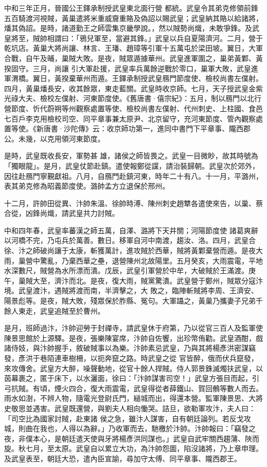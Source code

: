 \begin{pinyinscope}
 中和三年正月，晉國公王鐸承制授武皇東北面行營
 都統。武皇令其弟克修領前鋒五百騎渡河視賊，黃巢遣將米重威齎重賂及偽詔以賜武皇；武皇納其賂以給諸將，燔其偽詔。是時，諸道勤王之師雲集京畿學說。，然以賊勢尚熾，未敢爭鋒。及武皇將至，賊帥相謂曰：「鴉兒軍至，當避其鋒。」武皇以兵自夏陽濟河。二月，營于乾坑店。黃巢大將尚讓、林言、王璠、趙璋等引軍十五萬屯於梁田坡。翼日，大軍合戰，自午及晡，巢賊大敗。是夜，賊眾遁據華州。武皇進軍圍之，巢弟黃鄴、黃揆固守。三月，尚讓
 引大軍赴援，武皇率兵萬餘逆戰於零口，巢軍大敗，武皇進軍渭橋。翼日，黃揆棄華州而遁。王鐸承制授武皇鴈門節度使、檢校尚書左僕射。四月，黃巢燔長安，收其餘眾，東走藍關。武皇時收京師。七月，天子授武皇金紫光祿大夫、檢校左僕射、河東節度使。《舊唐書·僖宗紀》：五月，制以鴈門以北行營節度、忻代蔚朔等州觀察處置等使、檢校尚書左僕射、代州刺史、上柱國、食邑七百戶李克用檢校司空、同平章事兼太原尹、北京留守，充河東節度、管內觀察處置等使。《新唐書·沙陀傳》云：收京師功第一，進同中書門下平章事、隴西郡公。未幾，以克用領河東節度。



 是時，武皇既收長安，軍勢甚
 雄，諸侯之師皆畏之。武皇一目微眇，故其時號為「獨眼龍」。是月，武皇仗節赴鎮。遣使報鄭從讜，請治裝歸朝。武皇次於郊外，因往赴鴈門寧覲獻祖。八月，自鴈門赴鎮河東，時年二十有八。十一月，平潞州，表其弟克修為昭義節度使。潞帥孟方立退保於邢州。



 十二月，許帥田從異、汴帥朱溫、徐帥時溥、陳州刺史趙犨各遣使來告，以巢、蔡合從，凶鋒尚熾，請武皇共力討賊。



 中和四年春，武皇率蕃漢之師五萬，自澤、潞將下天井關；河陽節度使
 諸葛爽辭以河橋不完，乃屯兵於萬善。數日。移軍自河中南渡，趨汝、洛。四月，武皇合徐、汴之師破尚讓于太康，斬獲萬計，進攻賊於西華，賊將黃鄴棄營而遁。是夜大雨，巢營中驚亂，乃棄西華之壘，退營陳州北故陽里。五月癸亥，大雨震電，平地水深數尺，賊營為水所漂而潰。戊辰，武皇引軍營於中牟，大破賊於王滿渡。庚午，巢賊大至，濟汴而北。是夜，復大雨，賊黨驚潰。武皇營于鄭州，賊眾分寇汴境。武皇渡汴，遇賊將渡而南，半濟擊之，大
 敗之，臨陣斬賊將李周、王濟安、陽景彪等。是夜，賊大敗，殘眾保於胙縣、冤句。大軍躡之，黃巢乃攜妻子兄弟千餘人東走，武皇追賊至於曹州。



 是月，班師過汴，汴帥迎勞于封禪寺，請武皇休于府第，乃以從官三百人及監軍使陳景思館於上源驛。是夜，張樂陳宴席，汴帥自佐饗，出珍幣侑勸。武皇酒酣，戲諸侍妓，與汴帥握手，敘破賊事以為樂。汴帥素忌武皇，乃與其將楊彥洪密謀竊發，彥洪于巷陌連車樹柵，以扼奔竄之路。時武皇之從
 官皆醉，俄而伏兵竄發，來攻傳舍。武皇方大醉，噪聲動地，從官十餘人捍賊。侍人郭景銖滅燭扶武皇，以茵幕裹之，匿于床下，以水灑面，徐曰：「汴帥謀害司空！」武皇方張目而起，引弓抗賊。有頃，煙火四合，復大雨震電，武皇得從者薛鐵山、賀回鶻等數人而去。雨水如澍，不辨人物，隨電光登尉氏門，縋城而出，得還本營。監軍陳景思、大將史敬思並遇害。武皇既還營，與劉夫人相向慟哭。詰旦，欲勒軍攻汴，夫人曰：「司空比為國家討賊，赴東諸
 侯之急，雖汴人謀害，自有朝廷論列。若反戈攻城，則曲在我也，人得以為辭。」乃收軍而去，馳檄於汴帥。汴帥報曰：「竊發之夜，非僕本心，是朝廷遣天使與牙將楊彥洪同謀也。」武皇自武牢關西趨蒲、陜而旋。秋七月，至太原。武皇自以累立大功，為汴帥怨圖，陷沒諸將，乃上章申理。及武皇表至，朝廷大恐，遣內臣宣諭，尋加守太傅、同平章事、隴西郡王。




\end{pinyinscope}
